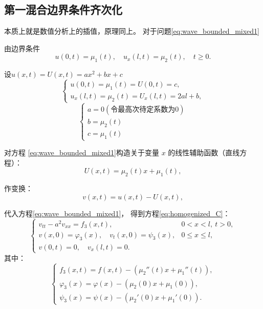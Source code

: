 \documentclass[a4paper, 12pt, oneside]{article} %
\numberwithin{subsection}{section}
\numberwithin{subsubsection}{subsection}
\theoremstyle{plain}
\theoremstyle{definition}
\theoremstyle{remark}
\begin{document}
		
		
		\subsection{第一混合边界条件齐次化}
		本质上就是数值分析上的插值，原理同上。
		对于问题\eqref{eq:wave_bounded_mixed1}
		
		由边界条件
		\begin{equation}
			u(0,t) = \mu_1(t), \quad u_x(l,t) = \mu_2(t), \quad t \geq 0.
		\end{equation}
		
		设$u(x, t)=U(x, t)=ax^2+bx+c$
		\[
		\begin{cases}
			u(0, t) = \mu_1(t) = U(0, t) = c, \\
			u_x(l, t) = \mu_2(t) = U_x(l, t) = 2al + b,
		\end{cases}
		\]
		\[
		\begin{cases}
			a = 0 (\text{令最高次待定系数为0})\\
			b =\mu_2(t) \\
			c = \mu_1(t)
		\end{cases}
		\]
		
		对方程 \eqref{eq:wave_bounded_mixed1}构造关于变量 \(x\) 的线性辅助函数（直线方程）：
		\begin{equation}
			U(x, t) =  \mu_2(t) x+\mu_1(t) ,
		\end{equation}
		
		作变换：
		\begin{equation}
			v(x, t) = u(x, t) - U(x, t),
		\end{equation}
		
		代入方程\eqref{eq:wave_bounded_mixed1}，
		得到方程\eqref{eq:homogenized_C}：
		\begin{equation}\label{eq:homogenized_C}
			\begin{cases}
				v_{tt} - a^2 v_{xx} = f_3(x, t), & 0 < x < l, \ t > 0, \\
				v(x, 0) = \varphi_3(x), \quad v_t(x, 0) = \psi_3(x), & 0 \leq x \leq l, \\
				v(0, t) = 0, \quad v_x(l, t) = 0. &
			\end{cases}
		\end{equation}
		其中：
		\begin{equation}
			\begin{cases}
				f_3(x, t) = f(x, t) - (\mu_2''(t)x + \mu_1''(t)), \\
				\varphi_3(x) = \varphi(x) - (\mu_2(0)x + \mu_1(0)), \\
				\psi_3(x) = \psi(x) - (\mu_2'(0)x + \mu_1'(0)).
			\end{cases}
		\end{equation}
		
\end{document}
